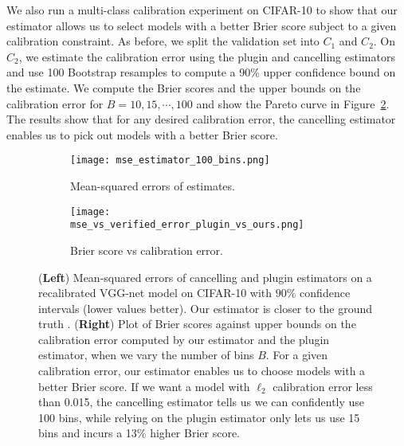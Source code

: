 
We also run a multi-class calibration experiment on CIFAR-10 to show that our estimator allows us to select models with a better  Brier  score subject to a given calibration constraint. As before, we split the validation set into $C_1$ and $C_2$. On $C_2$, we estimate the calibration error using the plugin and cancelling estimators and use 100 Bootstrap resamples to compute a 90\% upper confidence bound on the estimate. We compute the Brier scores and the upper bounds on the calibration error for $B = 10, 15, \cdots, 100$ and show the Pareto curve in Figure~\ref{fig:mse_vs_ce_estimators}. The results show that for any desired calibration error, the cancelling estimator enables us to pick out models with a better Brier score.

\begin{figure}
  \centering
  \centering
     \begin{subfigure}[b]{0.45\textwidth}
         \centering
         \texttt{[image: mse\_estimator\_100\_bins.png]}
         \caption{Mean-squared errors of estimates.
         }
         \label{fig:mse_estimators}
     \end{subfigure}
     \hfill
     \begin{subfigure}[b]{0.45\textwidth}
         \centering
         \texttt{[image: mse\_vs\_verified\_error\_plugin\_vs\_ours.png]}
         \caption{Brier score vs calibration error.
         }
         \label{fig:mse_vs_ce_estimators}
     \end{subfigure}
  \caption{
    (\textbf{Left}) Mean-squared errors of cancelling and plugin estimators on a recalibrated VGG-net model on CIFAR-10 with $90\%$ confidence intervals (lower values better). Our estimator is closer to the ground truth .
  (\textbf{Right}) Plot of Brier scores against upper bounds  on the calibration error computed by our estimator and the plugin estimator, when we vary the number of bins $B$. For a given calibration error, our estimator enables us to choose models with a better Brier score. If we want a model with $\ell_2$ calibration error less than 0.015, the cancelling estimator tells us we can confidently use 100 bins, while relying on the plugin estimator only lets us use 15 bins and incurs a 13\% higher Brier score.
}
  \label{fig:mse_estimators_bins}
\end{figure}

